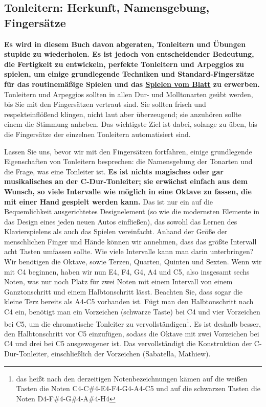 \subsection{Tonleitern: Herkunft, Namensgebung, Fingersätze}\hypertarget{c1iii5d}{}

\textbf{Es wird in diesem Buch davon abgeraten, Tonleitern und Übungen stupide zu wiederholen.
Es ist jedoch von entscheidender Bedeutung, die Fertigkeit zu entwickeln, perfekte Tonleitern und Arpeggios zu spielen, um einige grundlegende Techniken und Standard-Fingersätze für das routinemäßige Spielen und das \hyperlink{c1iii11}{Spielen vom Blatt} zu erwerben.}
Tonleitern und Arpeggios sollten in allen Dur- und Molltonarten geübt werden, bis Sie mit den Fingersätzen vertraut sind.
Sie sollten frisch und respekteinflößend klingen, nicht laut aber überzeugend; sie anzuhören sollte einem die Stimmung anheben.
Das wichtigste Ziel ist dabei, solange zu üben, bis die Fingersätze der einzelnen Tonleitern automatisiert sind. 

Lassen Sie uns, bevor wir mit den Fingersätzen fortfahren, einige grundlegende Eigenschaften von Tonleitern besprechen: die Namensgebung der Tonarten und die Frage, was eine Tonleiter ist.
\textbf{Es ist nichts magisches oder gar musikalisches an der C-Dur-Tonleiter; sie erwächst einfach aus dem Wunsch, so viele Intervalle wie möglich in eine Oktave zu fassen, die mit einer Hand gespielt werden kann.}
Das ist nur ein auf die Bequemlichkeit ausgerichtetes Designelement (so wie die modernsten Elemente in das Design eines jeden neuen Autos einfließen), das sowohl das Lernen des Klavierspielens als auch das Spielen vereinfacht.
Anhand der Größe der menschlichen Finger und Hände können wir annehmen, dass das größte Intervall acht Tasten umfassen sollte.
Wie viele Intervalle kann man darin unterbringen?
Wir benötigen die Oktave, sowie Terzen, Quarten, Quinten und Sexten.
Wenn wir mit C4 beginnen, haben wir nun E4, F4, G4, A4 und C5, also insgesamt sechs Noten, was nur noch Platz für zwei Noten mit einem Intervall von einem Ganztonschritt und einem Halbtonschritt lässt.
Beachten Sie, dass sogar die kleine Terz bereits als A4-C5 vorhanden ist.
Fügt man den Halbtonschritt nach C4 ein, benötigt man ein Vorzeichen (schwarze Taste) bei C4 und vier Vorzeichen bei C5, um die chromatische Tonleiter zu vervollständigen\footnote{das heißt nach den derzeitigen Notenbezeichnungen kämen auf die weißen Tasten die Noten C4-C\#4-E4-F4-G4-A4-C5 und auf die schwarzen Tasten die Noten D4-F\#4-G\#4-A\#4-H4}.
Es ist deshalb besser, den Halbtonschritt vor C5 einzufügen, sodass die Oktave mit zwei Vorzeichen bei C4 und drei bei C5 ausgewogener ist.
Das vervollständigt die Konstruktion der C-Dur-Tonleiter, einschließlich der Vorzeichen (Sabatella, Mathiew).

